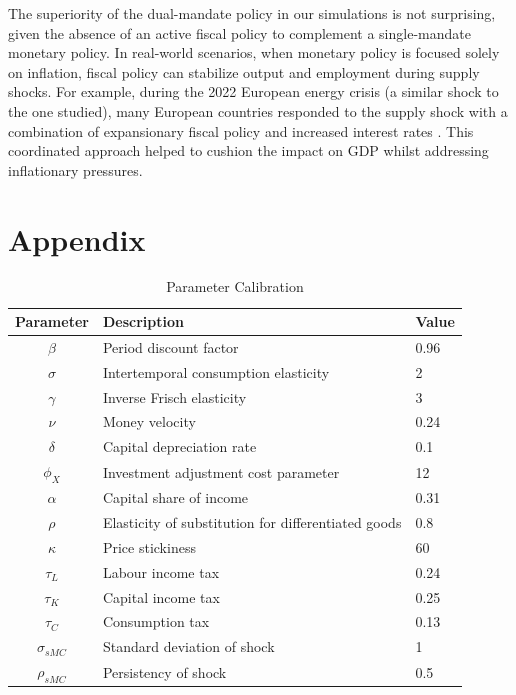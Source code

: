 \documentclass[12pt]{article}
\begin{document}
The superiority of the dual-mandate policy in our simulations is not surprising, given the absence of an active fiscal policy to complement a single-mandate monetary policy. In real-world scenarios, when monetary policy is focused solely on inflation, fiscal policy can stabilize output and employment during supply shocks. For example, during the 2022 European energy crisis (a similar shock to the one studied), many European countries responded to the supply shock with a combination of expansionary fiscal policy and increased interest rates \parencite{bankoffinlandEuropeanCentralBanks2022, checherita-westphalUpdateEuroArea2023}. This coordinated approach helped to cushion the impact on GDP whilst addressing inflationary pressures.
\newpage %
\printbibliography{} %

\newpage
\appendix
\section{Appendix}
\begin{table}[ht]
    \centering
    \caption{Parameter Calibration}\label{tab:parameters}
    \begin{tabular}{cll}
        \toprule
        Parameter & Description & Value  \\ \midrule
        $\beta$ & Period discount factor  & 0.96  \\
        $\sigma$ & Intertemporal consumption elasticity  & 2  \\
        $\gamma$ & Inverse Frisch elasticity  & 3  \\
        $\nu$ & Money velocity  & 0.24  \\
        $\delta$ & Capital depreciation rate  & 0.1  \\
        $\phi_X$ & Investment adjustment cost parameter & 12  \\
        $\alpha$ & Capital share of income & 0.31  \\
        $\rho$ & Elasticity of substitution for differentiated goods &  0.8  \\
        $\kappa$ & Price stickiness & 60 \\
        ${\tau_L}$ & Labour income tax & 0.24 \\
        ${\tau_K}$ & Capital income tax & 0.25 \\
        ${\tau_C}$ & Consumption tax & 0.13 \\
        $\sigma_{sMC}$ & Standard deviation of shock & 1 \\
        $\rho_{sMC}$ & Persistency of shock & 0.5 \\
    \bottomrule
    \end{tabular}
\end{table}
\end{document}
